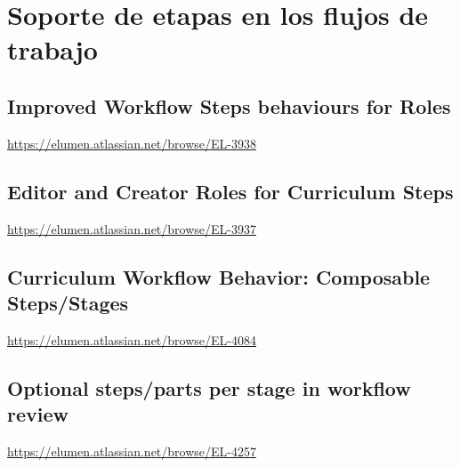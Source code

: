 \section{Soporte de etapas en los flujos de trabajo}
\subsection{Improved Workflow Steps behaviours for Roles}
\url{https://elumen.atlassian.net/browse/EL-3938}

\subsection{Editor and Creator Roles for Curriculum Steps}
\url{https://elumen.atlassian.net/browse/EL-3937}

\subsection{Curriculum Workflow Behavior: Composable Steps/Stages}
\url{https://elumen.atlassian.net/browse/EL-4084}

\subsection{Optional steps/parts per stage in workflow review}
\url{https://elumen.atlassian.net/browse/EL-4257}